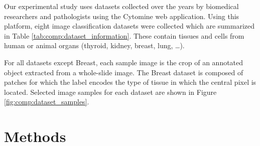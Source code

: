 \begin{figure*}
	\center
	\caption{Overview of our eight classification datasets (the display size does not reflect actual image size). For binary classification datasets, negative and positive samples were respectively placed at the top and bottom of the figures.}
	\label{fig:comp:dataset_samples}
\end{figure*}
 

Our experimental study uses datasets collected over the years by biomedical researchers and pathologists using the Cytomine \parencite{maree2016collaborative} web application. Using this platform, eight image classification datasets were collected which are summarized in Table \ref{tab:comp:dataset_information}. These contain tissues and cells from human or animal organs (thyroid, kidney, breast, lung, \ldots).

For all datasets except Breast, each sample image is the crop of an annotated object extracted from a whole-slide image. The Breast dataset is composed of patches for which the label encodes the type of tissue in which the central pixel is located. Selected image samples for each dataset are shown in Figure \ref{fig:comp:dataset_samples}. 




\section{Methods}



